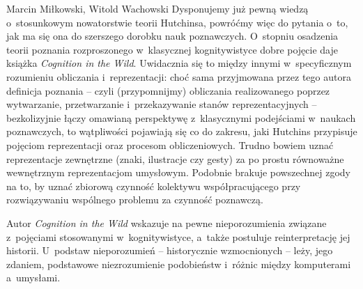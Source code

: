 \begin{artplenv2auth}{Marcin Miłkowski, Witold Wachowski}
Dysponujemy już pewną wiedzą o~stosunkowym nowatorstwie teorii Hutchinsa, powróćmy więc do pytania o~to, jak ma się ona do szerszego dorobku nauk poznawczych. O~stopniu osadzenia teorii poznania rozproszonego w~klasycznej kognitywistyce dobre pojęcie daje książka \textit{Cognition in the Wild}. Uwidacznia się to między innymi w~specyficznym rozumieniu obliczania i~reprezentacji: choć sama przyjmowana przez tego autora definicja poznania -- czyli (przypomnijmy) obliczania realizowanego poprzez wytwarzanie, przetwarzanie i~przekazywanie stanów reprezentacyjnych -- bezkolizyjnie łączy omawianą perspektywę z~klasycznymi podejściami w~naukach poznawczych, to wątpliwości pojawiają się co do zakresu, jaki Hutchins przypisuje pojęciom reprezentacji oraz procesom obliczeniowych. Trudno bowiem uznać reprezentacje zewnętrzne (znaki, ilustracje czy gesty) za po prostu równoważne wewnętrznym reprezentacjom umysłowym. Podobnie brakuje powszechnej zgody na to, by uznać zbiorową czynność kolektywu współpracującego przy rozwiązywaniu wspólnego problemu za czynność poznawczą.

Autor \textit{Cognition in the Wild} wskazuje na pewne nieporozumienia związane z~pojęciami stosowanymi w~kognitywistyce, a~także postuluje reinterpretację jej historii. U~podstaw nieporozumień -- historycznie wzmocnionych -- leży, jego zdaniem, podstawowe niezrozumienie podobieństw i~różnic między komputerami a~umysłami.


\end{artplenv2auth}
